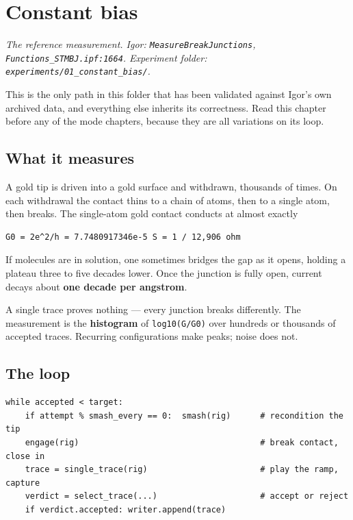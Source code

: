 \setcounter{chapter}{9}
\chapter{Constant bias}

\emph{The reference measurement. Igor: \texttt{Measure\discretionary{}{}{}Break\discretionary{}{}{}Junctions}, \texttt{Functions\_\discretionary{}{}{}STMBJ.\discretionary{}{}{}ipf:1664}. Experiment folder: \texttt{experiments/\discretionary{}{}{}01\_\discretionary{}{}{}constant\_\discretionary{}{}{}bias/\discretionary{}{}{}}.}

This is the only path in this folder that has been validated against Igor's own archived data, and everything else inherits its correctness. Read this chapter before any of the mode chapters, because they are all variations on its loop.

\section{What it measures}

A gold tip is driven into a gold surface and withdrawn, thousands of times. On each withdrawal the contact thins to a chain of atoms, then to a single atom, then breaks. The single-atom gold contact conducts at almost exactly

\begin{lstlisting}[style=out]
G0 = 2e^2/h = 7.7480917346e-5 S = 1 / 12,906 ohm
\end{lstlisting}

If molecules are in solution, one sometimes bridges the gap as it opens, holding a plateau three to five decades lower. Once the junction is fully open, current decays about \textbf{one decade per angstrom}.

A single trace proves nothing --- every junction breaks differently. The measurement is the \textbf{histogram} of \texttt{log10(G/\discretionary{}{}{}G0)} over hundreds or thousands of accepted traces. Recurring configurations make peaks; noise does not.

\section{The loop}

\begin{lstlisting}[style=out]
while accepted < target:
    if attempt % smash_every == 0:  smash(rig)      # recondition the tip
    engage(rig)                                     # break contact, close in
    trace = single_trace(rig)                       # play the ramp, capture
    verdict = select_trace(...)                     # accept or reject
    if verdict.accepted: writer.append(trace)
\end{lstlisting}

